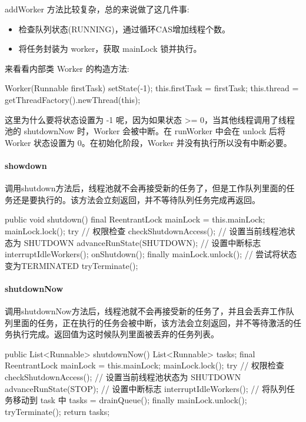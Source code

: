 addWorker 方法比较复杂，总的来说做了这几件事:
\begin{itemize}
    \item 检查队列状态(RUNNING)，通过循环CAS增加线程个数。
    \item 将任务封装为 worker，获取 mainLock 锁并执行。
\end{itemize}

来看看内部类 Worker 的构造方法:
\begin{Java}
Worker(Runnable firstTask) {
    setState(-1);
    this.firstTask = firstTask;
    this.thread = getThreadFactory().newThread(this);
}
\end{Java}

这里为什么要将状态设置为 -1 呢，因为如果状态 >= 0，当其他线程调用了线程池的 shutdownNow 时，Worker 会被中断。在 runWorker 中会在 unlock 后将 Worker 状态设置为 0。在初始化阶段，Worker 并没有执行所以没有中断必要。

\paragraph*{showdown}

调用shutdown方法后，线程池就不会再接受新的任务了，但是工作队列里面的任务还是要执行的。该方法会立刻返回，并不等待队列任务完成再返回。

\begin{Java}
public void shutdown() {
    final ReentrantLock mainLock = this.mainLock;
    mainLock.lock();
    try {
        // 权限检查
        checkShutdownAccess();
        // 设置当前线程池状态为 SHUTDOWN
        advanceRunState(SHUTDOWN);
        // 设置中断标志
        interruptIdleWorkers();
        onShutdown();
    } finally {
        mainLock.unlock();
    }
    // 尝试将状态变为TERMINATED
    tryTerminate();
}
\end{Java}

\paragraph*{shutdownNow}

调用shutdownNow方法后，线程池就不会再接受新的任务了，并且会丢弃工作队列里面的任务，正在执行的任务会被中断，该方法会立刻返回，并不等待激活的任务执行完成。返回值为这时候队列里面被丢弃的任务列表。

public List<Runnable> shutdownNow() {
    List<Runnable> tasks;
    final ReentrantLock mainLock = this.mainLock;
    mainLock.lock();
    try {
        // 权限检查
        checkShutdownAccess();
        // 设置当前线程池状态为 SHUTDOWN
        advanceRunState(STOP);
        // 设置中断标志
        interruptIdleWorkers();
        // 将队列任务移动到 task 中
        tasks = drainQueue();
    } finally {
        mainLock.unlock();
    }
    tryTerminate();
    return tasks;
}


